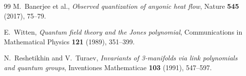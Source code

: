 \begin{thebibliography}{99}
M.~Banerjee et al.,
\emph{Observed quantization of anyonic heat flow},
Nature \textbf{545} (2017), 75--79.

E.~Witten,
\emph{Quantum field theory and the Jones polynomial},
Communications in Mathematical Physics \textbf{121} (1989), 351--399.

N.~Reshetikhin and V.~Turaev,
\emph{Invariants of 3-manifolds via link polynomials and quantum groups},
Inventiones Mathematicae \textbf{103} (1991), 547--597.

\end{thebibliography}
